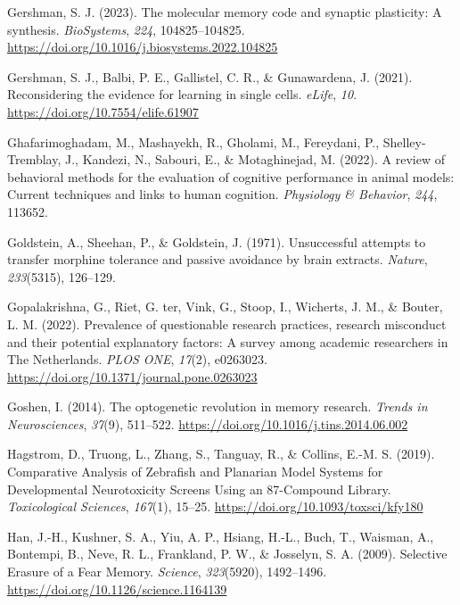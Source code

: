 \documentclass[
  jou,
  floatsintext,
  longtable,
  nolmodern,
  notxfonts,
  notimes,
  donotrepeattitle,
  colorlinks=true,linkcolor=blue,citecolor=blue,urlcolor=blue]{apa7}
\newlength{\cslhangindent}
\newenvironment{CSLReferences}[2] %
 {\begin{list}{}{%
  \setlength{\itemindent}{0pt}
  \setlength{\leftmargin}{0pt}
  \setlength{\parsep}{0pt}
  \ifodd #1
   \setlength{\leftmargin}{\cslhangindent}
   \setlength{\itemindent}{-1\cslhangindent}
  \fi
  \setlength{\itemsep}{#2\baselineskip}}}
 {\end{list}}
\begin{document}
\begin{CSLReferences}{1}{0}
Gershman, S. J. (2023). The molecular memory code and synaptic
plasticity: {A} synthesis. \emph{BioSystems}, \emph{224},
104825--104825. \url{https://doi.org/10.1016/j.biosystems.2022.104825}

Gershman, S. J., Balbi, P. E., Gallistel, C. R., \& Gunawardena, J.
(2021). Reconsidering the evidence for learning in single cells.
\emph{eLife}, \emph{10}. \url{https://doi.org/10.7554/elife.61907}

Ghafarimoghadam, M., Mashayekh, R., Gholami, M., Fereydani, P.,
Shelley-Tremblay, J., Kandezi, N., Sabouri, E., \& Motaghinejad, M.
(2022). A review of behavioral methods for the evaluation of cognitive
performance in animal models: Current techniques and links to human
cognition. \emph{Physiology \& Behavior}, \emph{244}, 113652.

Goldstein, A., Sheehan, P., \& Goldstein, J. (1971). Unsuccessful
attempts to transfer morphine tolerance and passive avoidance by brain
extracts. \emph{Nature}, \emph{233}(5315), 126--129.

Gopalakrishna, G., Riet, G. ter, Vink, G., Stoop, I., Wicherts, J. M.,
\& Bouter, L. M. (2022). Prevalence of questionable research practices,
research misconduct and their potential explanatory factors: {A} survey
among academic researchers in {The} {Netherlands}. \emph{PLOS ONE},
\emph{17}(2), e0263023.
\url{https://doi.org/10.1371/journal.pone.0263023}

Goshen, I. (2014). The optogenetic revolution in memory research.
\emph{Trends in Neurosciences}, \emph{37}(9), 511--522.
\url{https://doi.org/10.1016/j.tins.2014.06.002}

Hagstrom, D., Truong, L., Zhang, S., Tanguay, R., \& Collins, E.-M. S.
(2019). Comparative {Analysis} of {Zebrafish} and {Planarian} {Model}
{Systems} for {Developmental} {Neurotoxicity} {Screens} {Using} an
87-{Compound} {Library}. \emph{Toxicological Sciences}, \emph{167}(1),
15--25. \url{https://doi.org/10.1093/toxsci/kfy180}

Han, J.-H., Kushner, S. A., Yiu, A. P., Hsiang, H.-L., Buch, T.,
Waisman, A., Bontempi, B., Neve, R. L., Frankland, P. W., \& Josselyn,
S. A. (2009). Selective {Erasure} of a {Fear} {Memory}. \emph{Science},
\emph{323}(5920), 1492--1496.
\url{https://doi.org/10.1126/science.1164139}


\end{CSLReferences}
\end{document}
